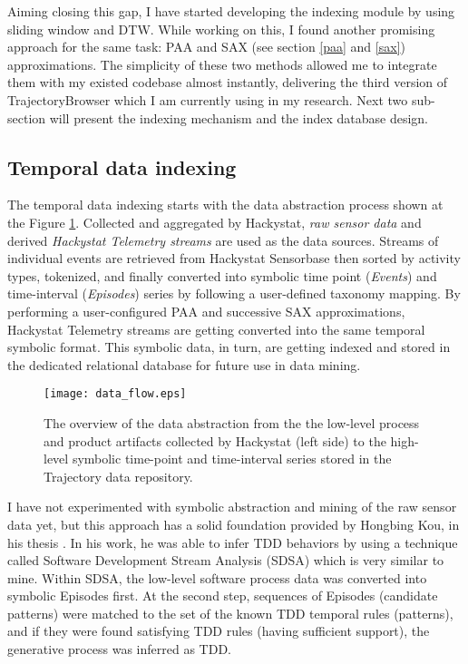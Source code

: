 Aiming closing this gap, I have started developing the indexing module by using sliding window and DTW. While working on this, I found another promising approach for the same task: PAA and SAX (see section \ref{paa} and \ref{sax}) approximations. The simplicity of these two methods allowed me to integrate them with my existed codebase almost instantly, delivering the third version of TrajectoryBrowser which I am currently using in my research. Next two sub-section will present the indexing mechanism and the index database design. 

\subsection{Temporal data indexing}
The temporal data indexing starts with the data abstraction process shown at the Figure \ref{fig:data_flow}. Collected and aggregated by Hackystat, \textit{raw sensor data} and derived \textit{Hackystat Telemetry streams} are used as the data sources. Streams of individual events are retrieved from Hackystat Sensorbase then sorted by activity types, tokenized, and finally converted into symbolic time point (\textit{Events}) and time-interval (\textit{Episodes}) series by following a user-defined taxonomy mapping. By performing a user-configured PAA and successive SAX approximations, Hackystat Telemetry streams are getting converted into the same temporal symbolic format. This symbolic data, in turn, are getting indexed and stored in the dedicated relational database for future use in data mining.

\begin{figure}[tbp]
   \centering
   \texttt{[image: data\_flow.eps]}
   \caption{The overview of the data abstraction from the the low-level process and product artifacts collected by Hackystat (left side) to the high-level symbolic time-point and time-interval series stored in the Trajectory data repository.}
   \label{fig:data_flow}
\end{figure}

I have not experimented with symbolic abstraction and mining of the raw sensor data yet, but this approach has a solid foundation provided by Hongbing Kou, in his thesis \cite{citeulike:2703162}. In his work, he was able to infer TDD behaviors by using a technique called Software Development Stream Analysis (SDSA) which is very similar to mine. Within SDSA, the low-level software process data was converted into symbolic Episodes first. At the second step, sequences of Episodes (candidate patterns) were matched to the set of the known TDD temporal rules (patterns), and if they were found satisfying TDD rules (having sufficient support), the generative process was inferred as TDD.

